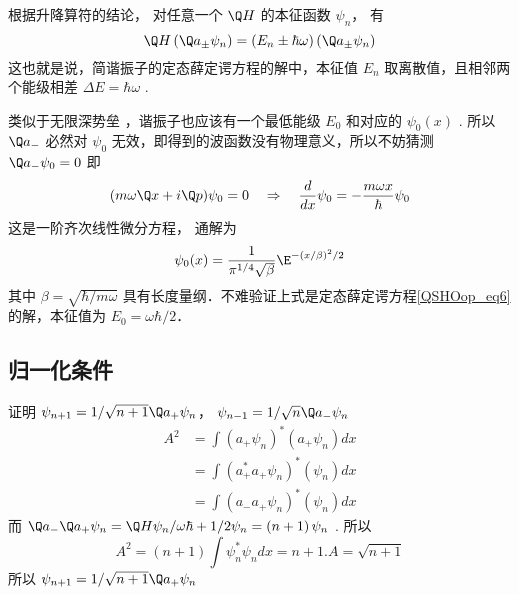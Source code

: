根据升降算符的结论，%
对任意一个 $\Q H$ 的本征函数 ${\psi_n}$， 有
\begin{equation}
  \Q H\left( {{{\Q a}_ \pm }{\psi_n}} \right) = \left( {{E_n} \pm \hbar \omega } \right)\left( {{{\Q a}_ \pm }{\psi_n}} \right)
\end{equation}
这也就是说，简谐振子的定态薛定谔方程的解中，本征值 ${E_n}$ 取离散值，且相邻两个能级相差 $\Delta E = \hbar \omega $ . 

类似于无限深势垒%
，谐振子也应该有一个最低能级 ${E_0}$ 和对应的 ${\psi_0}\left( x \right)$ . 所以 ${\Q a_ - }$ 必然对 ${\psi_0}$ 无效，即得到的波函数没有物理意义，所以不妨猜测 ${\Q a_ - }{\psi_0} = 0$ 
即
\begin{equation}
(m\omega \Q x + i\Q p){\psi_0} = 0
\quad \Rightarrow \quad
\frac{d}{{dx}}{\psi_0} =  - \frac{{m\omega x}}{\hbar }{\psi_0}
\end{equation}
这是一阶齐次线性微分方程，%
通解为
\begin{equation}
{\psi_0}(x) = \frac{1}{{{\pi ^{1/4}}\sqrt \beta  }}{\E^{ - {{(x/\beta )}^2}/2}}
\end{equation}
其中 $\beta = \sqrt {\hbar /m\omega }$ 具有长度量纲．不难验证上式是定态薛定谔方程\autoref{QSHOop_eq6} 的解，本征值为 $E_0=\omega\hbar/2$．


\subsection{归一化条件}


证明 ${\psi_{n + 1}} = {1}/{{\sqrt {n + 1} }}{\Q a_ + }{\psi_n}$，  ${\psi_{n - 1}} = {1}/{{\sqrt n }}{\Q a_ - }{\psi_n}$ 
\begin{equation}
\begin{aligned}
  {A^2} & = \int {{{\left( {{a_ + }{\psi_n}} \right)}^*}\left( {{a_ + }{\psi_n}} \right)dx} \\
   & = \int {{{\left( {a_ + ^*{a_ + }{\psi_n}} \right)}^*}\left( {{\psi_n}} \right)dx}  \\
   & = \int {{{\left( {{a_ - }{a_ + }{\psi_n}} \right)}^*}\left( {{\psi_n}} \right)dx}
\end{aligned}
\end{equation}
而 ${\Q a_ - }{\Q a_ + }{\psi_n} = {{\Q H{\psi_n}}}/{{\omega \hbar }} + {1}/{2}{\psi_n} = \left( {n + 1} \right){\psi_n}$ . 所以
\begin{equation}
  {A^2} = \left( {n + 1} \right)\int {\psi_n^*{\psi_n}dx}  = n + 1. A = \sqrt {n + 1}
\end{equation}
所以 ${\psi_{n + 1}} = {1}/{{\sqrt {n + 1} }}{\Q a_ + }{\psi_n}$

